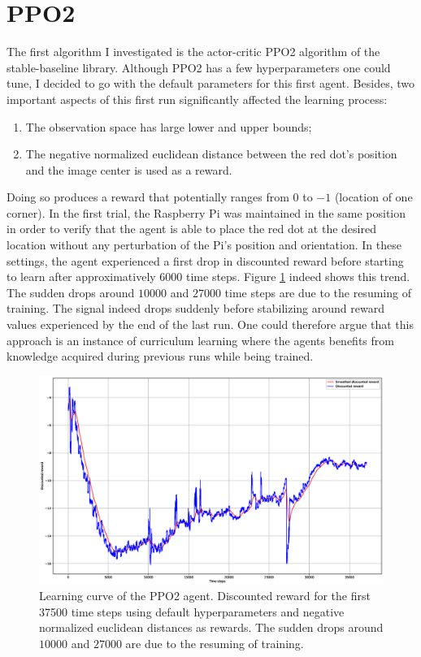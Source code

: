 \section{PPO2}

The first algorithm I investigated is the actor-critic PPO2 algorithm of the stable-baseline library. Although PPO2 has a few hyperparameters one could tune, I decided to go with the default parameters for this first agent. Besides,  two important aspects of this first run significantly affected the learning process:

\begin{enumerate}
	\item The observation space has large lower and upper bounds;
	\item The negative normalized euclidean distance between the red dot's position and the image center is used as a reward.
\end{enumerate}

Doing so produces a reward that potentially ranges from $0$ to $-1$ (location of one corner). In the first trial, the Raspberry Pi was maintained in the same position in order to verify that the agent is able to place the red dot at the desired location without any perturbation of the Pi's position and orientation. In these settings, the agent experienced a first drop in discounted reward before starting to learn after approximatively $6000$ time steps.  Figure \ref{reward_dist} indeed shows this trend. The sudden drops around $10000$ and $27000$ time steps are due to the resuming of training. The signal indeed drops suddenly before stabilizing around reward values experienced by the end of the last run. One could therefore argue that this approach is an instance of curriculum learning where the agents benefits from knowledge acquired during previous runs while being trained.

\begin{figure}[H]
	\centering
	\includegraphics[scale=0.2]{Images/ppo2_1.eps}
	\caption{Learning curve of the PPO2 agent.  Discounted reward for the first 37500 time steps using default hyperparameters and negative normalized euclidean distances as rewards. The sudden drops around $10000$ and $27000$ are due to the resuming of training.}
	\label{reward_dist}
\end{figure}

